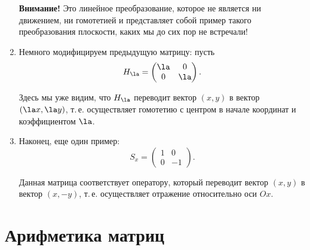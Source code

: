 \begin{enumerate}
\textbf{Внимание!} Это линейное преобразование, которое не является ни движением, ни гомотетией и представляет собой пример такого преобразования плоскости, каких мы до сих пор не встречали!


\item Немного модифицируем предыдущую матрицу: пусть
$$
H_\la = \begin{pmatrix}
\la & 0 \\ 0 & \la
\end{pmatrix}.
$$

Здесь мы уже видим, что $H_\la$ переводит вектор $(x,y)$ в вектор $(\la x,\la y)$, т.\,е. осуществляет гомотетию с центром в начале координат и коэффициентом $\la$.

\item Наконец, еще один пример:
$$
S_x = \begin{pmatrix}
1 & 0 \\ 0 & -1
\end{pmatrix}.
$$

Данная матрица соответствует оператору, который переводит вектор $(x,y)$ в вектор $(x,-y)$, т.\,е. осуществляет отражение относительно оси $Ox$.

\end{enumerate}


\section{Арифметика матриц}


